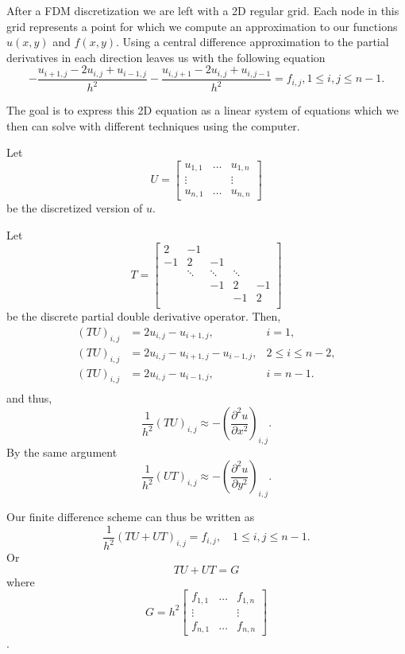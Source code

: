 \documentclass{article}
\begin{document}
After a FDM discretization we are left with a 2D regular grid. Each node in this grid represents
a point for which we compute an approximation to our functions $u(x,y)$ and $f(x,y)$.
Using a central difference approximation to the partial derivatives in each direction leaves us
with the following equation
\[
-\frac{u_{i+1,j}-2u_{i,j}+u_{i-1,j}}{h^2} - \frac{u_{i,j+1}-2u_{i,j}+u_{i,j-1}}{h^2} = f_{i,j}, 1\leq i,j \leq n-1.
\]

The goal is to express this 2D equation as a linear system of equations which we then can solve with
different techniques using the computer.

Let
\begin{equation}
	U = \begin{bmatrix}
		u_{1,1} & \dots & u_{1,n} \\
		\vdots  &       & \vdots \\
		u_{n,1} & \dots & u_{n,n}
	\end{bmatrix}
\end{equation}
be the discretized version of $u$.

Let 
\begin{equation}
	T = \begin{bmatrix}
		2 & -1 & & & \\
		-1 & 2 & -1 & & \\
		& \ddots & \ddots & \ddots &\\
		& & -1 & 2 & -1\\
		& & & -1 & 2 \\
	\end{bmatrix}
\end{equation}
be the discrete partial double derivative operator.
Then,
\begin{align*}
	(TU)_{i,j} &= 2u_{i,j} - u_{i+1,j}, &i=1,\\
	(TU)_{i,j} &= 2u_{i,j} - u_{i+1,j} - u_{i-1,j}, &2 \leq i \leq n-2,\\
	(TU)_{i,j} &= 2u_{i,j} - u_{i-1,j}, &i=n-1.\\
\end{align*}
and thus,
\[
\frac{1}{h^2}(TU)_{i,j} \approx - \left(\frac{\partial^2 u}{\partial x^2}\right)_{i,j}.
\]
By the same argument
\[
\frac{1}{h^2}(UT)_{i,j} \approx - \left(\frac{\partial^2 u}{\partial y^2}\right)_{i,j}.
\]

Our finite difference scheme can thus be written as
\[
\frac{1}{h^2}(TU + UT)_{i,j} = f_{i,j}, \quad 1\leq i,j \leq n-1.
\]
Or
\[
\label{linsys}
TU + UT = G
\]
where
\begin{equation}
G = h^2 \begin{bmatrix}
		f_{1,1} & \dots & f_{1,n} \\
		\vdots  &       & \vdots \\
		f_{n,1} & \dots & f_{n,n}
	\end{bmatrix}
\end{equation}.
\end{document}
